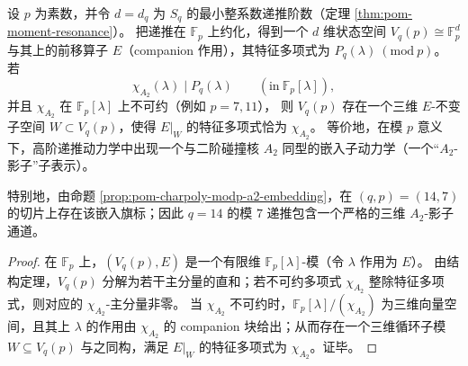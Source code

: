 \begin{corollary}\label{cor:pom-charpoly-modp-a2-subdynamics}
设 \(p\) 为素数，并令 \(d=d_q\) 为 \(S_q\) 的最小整系数递推阶数（定理 \ref{thm:pom-moment-resonance}）。
把递推在 \(\mathbb{F}_p\) 上约化，得到一个 \(d\) 维状态空间 \(V_q(p)\cong\mathbb{F}_p^{d}\) 与其上的前移算子 \(E\)（companion 作用），其特征多项式为 \(P_q(\lambda)\ (\mathrm{mod}\ p)\)。
若
\[
\chi_{A_2}(\lambda)\mid P_q(\lambda)\qquad(\mathrm{in}\ \mathbb{F}_p[\lambda]),
\]
并且 \(\chi_{A_2}\) 在 \(\mathbb{F}_p[\lambda]\) 上不可约（例如 \(p=7,11\)），
则 \(V_q(p)\) 存在一个三维 \(E\)-不变子空间 \(W\subset V_q(p)\)，使得 \(E|_{W}\) 的特征多项式恰为 \(\chi_{A_2}\)。
等价地，在模 \(p\) 意义下，高阶递推动力学中出现一个与二阶碰撞核 \(A_2\) 同型的嵌入子动力学（一个“\(A_2\)-影子”子表示）。
\par
特别地，由命题 \ref{prop:pom-charpoly-modp-a2-embedding}，在 \((q,p)=(14,7)\) 的切片上存在该嵌入旗标；因此 \(q=14\) 的模 \(7\) 递推包含一个严格的三维 \(A_2\)-影子通道。
\end{corollary}
\begin{proof}
在 \(\mathbb{F}_p\) 上，\((V_q(p),E)\) 是一个有限维 \(\mathbb{F}_p[\lambda]\)-模（令 \(\lambda\) 作用为 \(E\)）。
由结构定理，\(V_q(p)\) 分解为若干主分量的直和；若不可约多项式 \(\chi_{A_2}\) 整除特征多项式，则对应的 \(\chi_{A_2}\)-主分量非零。
当 \(\chi_{A_2}\) 不可约时，\(\mathbb{F}_p[\lambda]/(\chi_{A_2})\) 为三维向量空间，且其上 \(\lambda\) 的作用由 \(\chi_{A_2}\) 的 companion 块给出；从而存在一个三维循环子模 \(W\subseteq V_q(p)\) 与之同构，满足 \(E|_W\) 的特征多项式为 \(\chi_{A_2}\)。证毕。
\end{proof}

